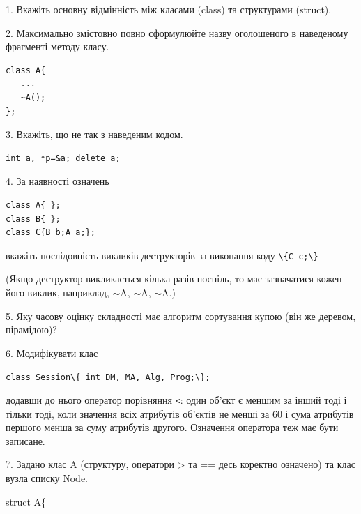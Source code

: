 \documentclass[12pt, ukrainian]{article}
\def\code#1{\Verb!#1!}
\begin{document}
{%
1. Вкажіть основну відмінність між класами (class) та структурами (struct).%
\par
\vspace{2mm}
2. Максимально змістовно повно сформулюйте назву оголошеного в наведеному фрагменті методу класу.
\vspace{-3mm}
\begin{verbatim}class A{
   ...
   ~A();
};\end{verbatim}
\vspace{-3mm}
\par
\vspace{2mm}
3. Вкажіть, що не так з наведеним кодом.
\vspace{-3mm}
\begin{verbatim}int a, *p=&a; delete a;\end{verbatim}
\vspace{-3mm}
\par
\vspace{2mm}
4. За наявності означень
\vspace{-3mm}
\begin{verbatim}
class A{ };
class B{ };
class C{B b;A a;};\end{verbatim}
\vspace{-3mm}
вкажіть послідовність викликів деструкторів за виконання коду \code{\{C c;\}} 

(Якщо деструктор викликається кілька разів поспіль, то має зазначатися кожен його виклик, наприклад, $\sim$A, $\sim$A, $\sim$A.)

\vspace{2mm}
5. Яку часову оцінку складності має алгоритм сортування купою (він же деревом, пірамідою)?
\par
\vspace{2mm}
6. Модифікувати клас 

\qquad\code{class Session\{ int DM, MA, Alg, Prog;\};} 


додавши до нього оператор порівняння \code{<}: один об'єкт є меншим за інший тоді і тільки тоді, коли значення всіх атрибутів об'єктів не менші за 60 і сума атрибутів першого менша за суму атрибутів другого. Означення оператора теж має бути записане.%
\par
\vspace{2mm}
7. 
Задано клас A (структуру, оператори > та == десь коректно означено) та клас вузла списку Node.

struct A\{

}
\end{document}
